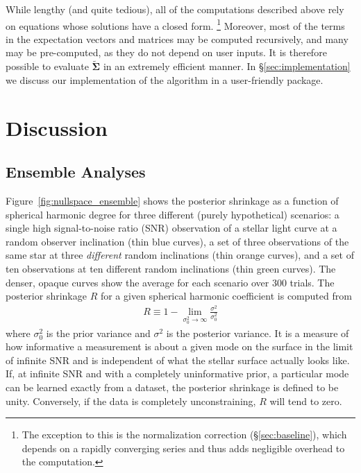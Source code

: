 \documentclass[modern]{aastex62}
\begin{document}
While lengthy (and quite tedious), all of the computations described above rely
on equations whose solutions have a closed form.%
%
\footnote{The exception to this is the
    normalization correction (\S\ref{sec:baseline}), which depends on a rapidly
    converging series and thus adds negligible overhead to the computation.}
%
Moreover, most of the terms in the expectation vectors and matrices may
be computed recursively, and many may be pre-computed, as they do not
depend on user inputs.
%
It is therefore possible to evaluate $\tilde{\pmb{\Sigma}}$ in an extremely
efficient manner. In \S\ref{sec:implementation} we discuss our
implementation of the algorithm in a user-friendly \Python package.


\section{Discussion}
\label{sec:discussion}

\subsection{Ensemble Analyses}
\label{sec:ensemble}

Figure~\ref{fig:nullspace_ensemble} shows the posterior shrinkage
as a function of spherical harmonic degree for three different
(purely hypothetical) scenarios: a single high signal-to-noise ratio (SNR)
observation of a stellar light curve at a random
observer inclination (thin blue curves), a set of three observations
of the same star at three \emph{different} random inclinations (thin
orange curves), and a set of ten observations at ten different
random inclinations (thin green curves).
The denser, opaque curves show the average for each scenario over 300 trials.
The posterior shrinkage $R$ for a given
spherical harmonic coefficient is computed from
%
\begin{align}
    R \equiv 1 - \lim\limits_{\sigma_0^2 \rightarrow \infty}
    \frac{\sigma^2}{\sigma_0^2}
\end{align}
%
where $\sigma_0^2$ is the prior variance
and $\sigma^2$ is the posterior variance.
It is a measure of how informative a measurement is about a
given mode on the surface in the limit of infinite SNR
and is independent of what the stellar surface actually looks like.
If, at infinite SNR and with a completely uninformative prior,
a particular mode can be learned exactly from a dataset, the posterior
shrinkage is defined to be unity. Conversely, if the data is completely
unconstraining, $R$ will tend to zero.
\end{document}
